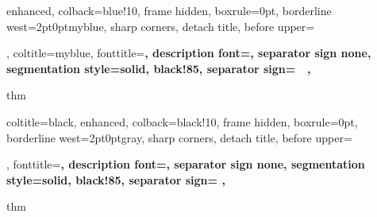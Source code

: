 
\usepackage{appendix}   %




    

    {%
        enhanced,
        colback=blue!10,
        frame hidden,
        boxrule=0pt,
        borderline west={2pt}{0pt}{myblue},
        sharp corners,
        detach title,
        before upper=\tcbtitle\par\smallskip,
        coltitle=myblue,
        fonttitle=\bfseries\sffamily,
        description font=\descriptionfira\mdseries,
        separator sign none,
        segmentation style={solid, black!85},
        separator sign= {\,\,\,\,},
    }%
    {thm}%

    {%
      \begin{imytheo}{#1}{}%
    }{%
      \end{imytheo}%
    }


\newtheorem{theorem}{Theorem}[section]

{%
    coltitle=black,
    enhanced,
    colback=black!10,
    frame hidden,
    boxrule=0pt,
    borderline west={2pt}{0pt}{gray},
    sharp corners,
    detach title,
    before upper=\tcbtitle\par\smallskip,
    fonttitle=\bfseries\sffamily,
    description font=\descriptionfira\mdseries,
    separator sign none,
    segmentation style={solid, black!85},
    separator sign= {\;}, %
}%
{thm}%

